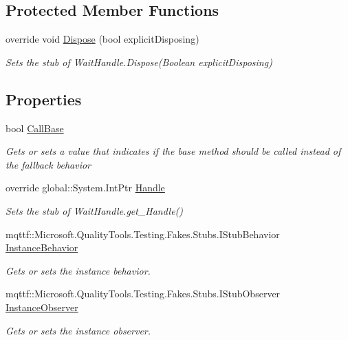 \subsection*{Protected Member Functions}
\begin{DoxyCompactItemize}
\item 
override void \hyperlink{class_system_1_1_threading_1_1_fakes_1_1_stub_wait_handle_ab20d74840088deadd7f149ce89ef8a7f}{Dispose} (bool explicit\-Disposing)
\begin{DoxyCompactList}\small\item\em Sets the stub of Wait\-Handle.\-Dispose(\-Boolean explicit\-Disposing)\end{DoxyCompactList}\end{DoxyCompactItemize}
\subsection*{Properties}
\begin{DoxyCompactItemize}
\item 
bool \hyperlink{class_system_1_1_threading_1_1_fakes_1_1_stub_wait_handle_a421e5d34035941762c404fe182fd3744}{Call\-Base}
\begin{DoxyCompactList}\small\item\em Gets or sets a value that indicates if the base method should be called instead of the fallback behavior\end{DoxyCompactList}\item 
override global\-::\-System.\-Int\-Ptr \hyperlink{class_system_1_1_threading_1_1_fakes_1_1_stub_wait_handle_a42a510b962c6a0a943f1486f496a94ed}{Handle}
\begin{DoxyCompactList}\small\item\em Sets the stub of Wait\-Handle.\-get\-\_\-\-Handle()\end{DoxyCompactList}\item 
mqttf\-::\-Microsoft.\-Quality\-Tools.\-Testing.\-Fakes.\-Stubs.\-I\-Stub\-Behavior \hyperlink{class_system_1_1_threading_1_1_fakes_1_1_stub_wait_handle_a1401e98871a69608a9f346ba77341dd2}{Instance\-Behavior}
\begin{DoxyCompactList}\small\item\em Gets or sets the instance behavior.\end{DoxyCompactList}\item 
mqttf\-::\-Microsoft.\-Quality\-Tools.\-Testing.\-Fakes.\-Stubs.\-I\-Stub\-Observer \hyperlink{class_system_1_1_threading_1_1_fakes_1_1_stub_wait_handle_a69ff162db28882273381a95f56d86d78}{Instance\-Observer}
\begin{DoxyCompactList}\small\item\em Gets or sets the instance observer.\end{DoxyCompactList}\end{DoxyCompactItemize}



